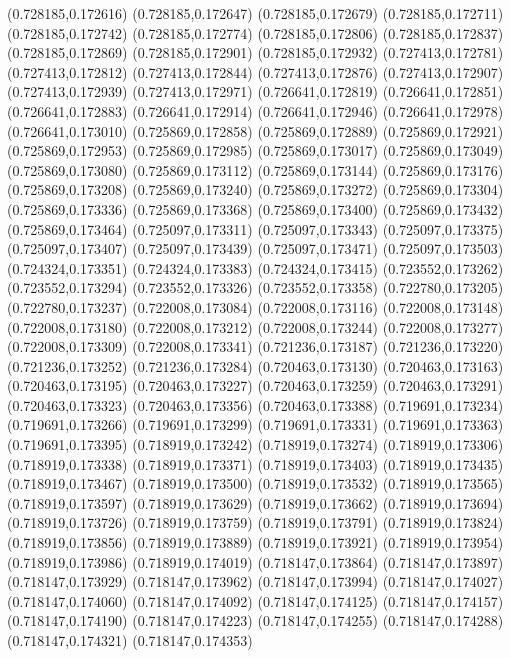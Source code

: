 (0.728185,0.172616)
(0.728185,0.172647)
(0.728185,0.172679)
(0.728185,0.172711)
(0.728185,0.172742)
(0.728185,0.172774)
(0.728185,0.172806)
(0.728185,0.172837)
(0.728185,0.172869)
(0.728185,0.172901)
(0.728185,0.172932)
(0.727413,0.172781)
(0.727413,0.172812)
(0.727413,0.172844)
(0.727413,0.172876)
(0.727413,0.172907)
(0.727413,0.172939)
(0.727413,0.172971)
(0.726641,0.172819)
(0.726641,0.172851)
(0.726641,0.172883)
(0.726641,0.172914)
(0.726641,0.172946)
(0.726641,0.172978)
(0.726641,0.173010)
(0.725869,0.172858)
(0.725869,0.172889)
(0.725869,0.172921)
(0.725869,0.172953)
(0.725869,0.172985)
(0.725869,0.173017)
(0.725869,0.173049)
(0.725869,0.173080)
(0.725869,0.173112)
(0.725869,0.173144)
(0.725869,0.173176)
(0.725869,0.173208)
(0.725869,0.173240)
(0.725869,0.173272)
(0.725869,0.173304)
(0.725869,0.173336)
(0.725869,0.173368)
(0.725869,0.173400)
(0.725869,0.173432)
(0.725869,0.173464)
(0.725097,0.173311)
(0.725097,0.173343)
(0.725097,0.173375)
(0.725097,0.173407)
(0.725097,0.173439)
(0.725097,0.173471)
(0.725097,0.173503)
(0.724324,0.173351)
(0.724324,0.173383)
(0.724324,0.173415)
(0.723552,0.173262)
(0.723552,0.173294)
(0.723552,0.173326)
(0.723552,0.173358)
(0.722780,0.173205)
(0.722780,0.173237)
(0.722008,0.173084)
(0.722008,0.173116)
(0.722008,0.173148)
(0.722008,0.173180)
(0.722008,0.173212)
(0.722008,0.173244)
(0.722008,0.173277)
(0.722008,0.173309)
(0.722008,0.173341)
(0.721236,0.173187)
(0.721236,0.173220)
(0.721236,0.173252)
(0.721236,0.173284)
(0.720463,0.173130)
(0.720463,0.173163)
(0.720463,0.173195)
(0.720463,0.173227)
(0.720463,0.173259)
(0.720463,0.173291)
(0.720463,0.173323)
(0.720463,0.173356)
(0.720463,0.173388)
(0.719691,0.173234)
(0.719691,0.173266)
(0.719691,0.173299)
(0.719691,0.173331)
(0.719691,0.173363)
(0.719691,0.173395)
(0.718919,0.173242)
(0.718919,0.173274)
(0.718919,0.173306)
(0.718919,0.173338)
(0.718919,0.173371)
(0.718919,0.173403)
(0.718919,0.173435)
(0.718919,0.173467)
(0.718919,0.173500)
(0.718919,0.173532)
(0.718919,0.173565)
(0.718919,0.173597)
(0.718919,0.173629)
(0.718919,0.173662)
(0.718919,0.173694)
(0.718919,0.173726)
(0.718919,0.173759)
(0.718919,0.173791)
(0.718919,0.173824)
(0.718919,0.173856)
(0.718919,0.173889)
(0.718919,0.173921)
(0.718919,0.173954)
(0.718919,0.173986)
(0.718919,0.174019)
(0.718147,0.173864)
(0.718147,0.173897)
(0.718147,0.173929)
(0.718147,0.173962)
(0.718147,0.173994)
(0.718147,0.174027)
(0.718147,0.174060)
(0.718147,0.174092)
(0.718147,0.174125)
(0.718147,0.174157)
(0.718147,0.174190)
(0.718147,0.174223)
(0.718147,0.174255)
(0.718147,0.174288)
(0.718147,0.174321)
(0.718147,0.174353)
